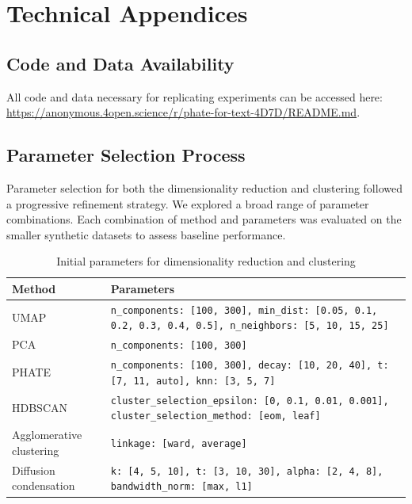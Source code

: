 
% 

\section{Technical Appendices}
\subsection{Code and Data Availability}
All code and data necessary for replicating experiments can be accessed here: \url{https://anonymous.4open.science/r/phate-for-text-4D7D/README.md}. 
\subsection{Parameter Selection Process}
\label{subsec:parameters}
Parameter selection for both the dimensionality reduction and clustering followed a progressive refinement strategy. We explored a broad range of parameter combinations. Each combination of method and parameters was evaluated on the smaller synthetic datasets to assess baseline performance.

\begin{table}[ht]
\centering
\caption{Initial parameters for dimensionality reduction and clustering}
\begin{tabular}
{@{}lp{10cm}@{}}
\toprule
\textbf{Method} & \textbf{Parameters} \\ \midrule
UMAP & \texttt{n\_components: [100, 300], min\_dist: [0.05, 0.1, 0.2, 0.3, 0.4, 0.5], n\_neighbors: [5, 10, 15, 25]} \\ \midrule
PCA & \texttt{n\_components: [100, 300]} \\ \midrule
PHATE & \texttt{n\_components: [100, 300], decay: [10, 20, 40], t: [7, 11, auto], knn: [3, 5, 7]} \\ \midrule
HDBSCAN & \texttt{cluster\_selection\_epsilon: [0, 0.1, 0.01, 0.001], cluster\_selection\_method: [eom, leaf]} \\ \midrule
Agglomerative clustering & \texttt{linkage: [ward, average]} \\ \midrule
Diffusion condensation & \texttt{k: [4, 5, 10], t: [3, 10, 30], alpha: [2, 4, 8], bandwidth\_norm: [max, l1]} \\
\bottomrule
\end{tabular}
\end{table}

